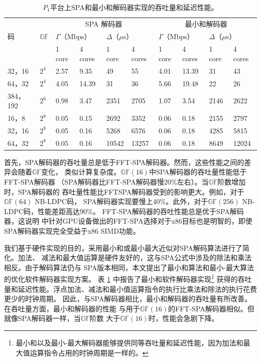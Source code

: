 \documentclass{cjc}
\begin{document}
\begin{table}[htb]
  \caption{$P_1$平台上SPA和最小和解码器实现的吞吐量和延迟性能。}
  \label{tab:4}
  \centering
  \setlength\tabcolsep{10pt}%
  \begin{tabular}{llllllllll}
    \toprule
    &&\multicolumn{4}{c}{SPA 解码器}&\multicolumn{4}{c}{最小和解码器}\\
    码&$\mathbb{GF}$&\multicolumn{2}{l}{$\Gamma$（Mbps）}&\multicolumn{2}{l}{$\Delta$（$\mu$s）}&\multicolumn{2}{l}{$\Gamma$（Mbps）}&\multicolumn{2}{l}{$\Delta$（$\mu$s）}\\
    \cmidrule(r){3-4}\cmidrule(r){5-6}\cmidrule(r){7-8}\cmidrule(r){9-10}%
    &&1 core&4 cores&1 core&4 cores&1 core&4 cores&1 core&4 cores\\
    \midrule
    32，16&$2^4$&2.57&9.35&49&55&4.01&13.39&31&43\\
    64，32&$2^4$&4.05&14.39&31&36&5.66&19.48&22&26\\
    384，192&$2^6$&0.98&3.47&2351&2705&1.07&3.54&2146&2622\\
    16，8&$2^8$&0.05&0.15&2692&3352&0.06&0.18&2155&2797\\
    32，16&$2^8$&0.05&0.16&5268&6576&0.06&0.18&4285&5815\\
    64，32&$2^8$&0.05&0.16&10542&13257&0.06&0.18&8649&12024\\
    \bottomrule
  \end{tabular}
\end{table}

  首先，SPA解码器的吞吐量总是低于FFT-SPA解码器。然而，这些性能之间的差异会随着$\mathbb{GF}$变化，
  类似计算复杂度。$\mathbb{GF}(16)$中SPA解码器的吞吐量性能低于FFT-SPA解码器
  （SPA解码器比FFT-SPA解码器慢20\%左右）。当$\mathbb{GF}$阶数增加时，SPA解码器的
  吞吐量性能比FFTSPA解码器受到的影响更大。例如，对于$\mathbb{GF}(64)$ NB-LDPC码，
  SPA解码器实现要慢上40\%。此外，对于$\mathbb{GF}(256)$ NB-LDPC码，性能差距高达90\%。
  FFT-SPA解码器的吞吐性能总是优于SPA解码器，这说明\cite{noauthor_andrade_nodate}
  中针对GPU设备做出的FFT-SPA选择对于x86目标也是明智的，即使SPA解码器实现完全受益于x86 SIMD功能。

  我们基于硬件实现的目的，采用最小和或最小最大近似对SPA解码算法进行了简化。加法、
  减法和最大值运算是硬件友好的，这与SPA公式中涉及的除法和乘法相反。由于解码算法仍与
  SPA版本相同，本文提出了最小和算法和最小-最大算法的优化软件解码器实现方案。
  表 \ref{tab:4} 中报告了最小和软件解码器实现\footnote{最小和以及最小-最大解码器能够提供同等吞吐量和延迟性能，因为加法和最大值运算指令占用的时钟周期是一样的。}
  获得的吞吐量和延迟性能。浮点加法、减法和最小值运算指令的执行比乘法和除法的执行花费更少的时钟周期。
  因此，与SPA解码器相比，最小和解码器的吞吐量有所改善。在吞吐量方面，最小和解码器的性能
  与用于$\mathbb{GF}(16)$的FFT-SPA解码器相似。但就像SPA解码器一样，当$\mathbb{GF}$阶数
  大于$\mathbb{GF}(16)$时，性能会急剧下降。
\end{document}
